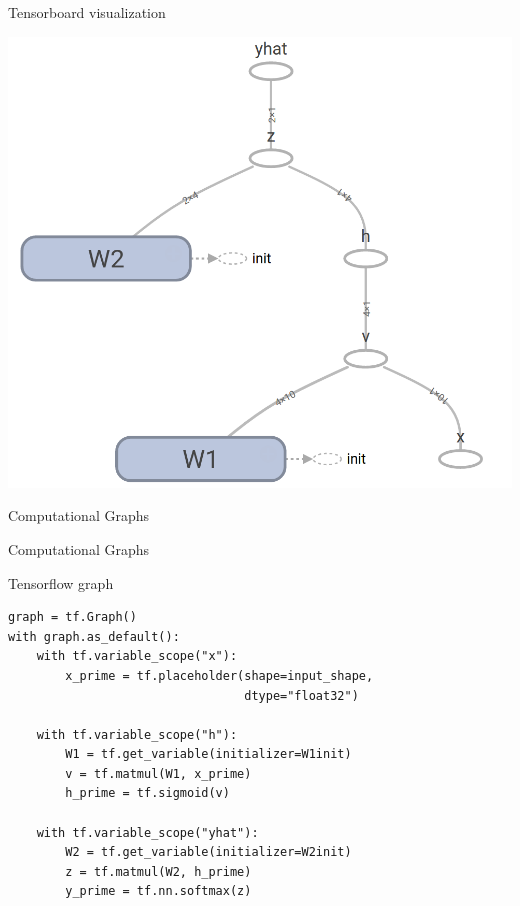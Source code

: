 \documentclass[10pt]{beamer}
\begin{document}
\begin{frame}[fragile]{Tensorboard visualization}
\begin{center}
\includegraphics[scale=0.255]{images/basic_tf_graph.png}
\end{center}
\end{frame}


\begin{frame}[fragile]{Computational Graphs}

\end{frame}

\begin{frame}[fragile]{Computational Graphs}

\end{frame}



\begin{frame}[fragile]{Tensorflow graph}
\begin{verbatim}
graph = tf.Graph() 
with graph.as_default():
    with tf.variable_scope("x"):
        x_prime = tf.placeholder(shape=input_shape,
                                 dtype="float32") 

    with tf.variable_scope("h"):
        W1 = tf.get_variable(initializer=W1init)
        v = tf.matmul(W1, x_prime)
        h_prime = tf.sigmoid(v)

    with tf.variable_scope("yhat"):
        W2 = tf.get_variable(initializer=W2init)
        z = tf.matmul(W2, h_prime)
        y_prime = tf.nn.softmax(z)
\end{verbatim}
\end{frame}
\end{document}
